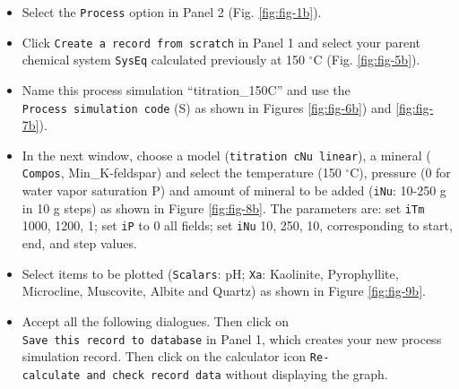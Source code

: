 \documentclass[
]{book}
\begin{document}
\begin{itemize}
\item
  Select the \texttt{Process} option in Panel 2 (Fig. \ref{fig:fig-1b}).
\item
  Click \texttt{Create\ a\ record\ from\ scratch} in Panel 1 and select your parent chemical system \texttt{SysEq} calculated previously at 150 \(^\circ\)C (Fig. \ref{fig:fig-5b}).
\item
  Name this process simulation ``titration\_150C'' and use the \texttt{Process\ simulation\ code} (S) as shown in Figures \ref{fig:fig-6b}) and \ref{fig:fig-7b}).
\item
  In the next window, choose a model (\texttt{titration\ cNu\ linear}), a mineral ( \texttt{Compos}, Min\_K-feldspar) and select the temperature (150 \(^\circ\)C), pressure (0 for water vapor saturation P) and amount of mineral to be added (\texttt{iNu}: 10-250 g in 10 g steps) as shown in Figure \ref{fig:fig-8b}. The parameters are: set \texttt{iTm} 1000, 1200, 1; set \texttt{iP} to 0 all fields; set \texttt{iNu} 10, 250, 10, corresponding to start, end, and step values.
\item
  Select items to be plotted (\texttt{Scalars}: pH; \texttt{Xa}: Kaolinite, Pyrophyllite, Microcline, Muscovite, Albite and Quartz) as shown in Figure \ref{fig:fig-9b}.
\item
  Accept all the following dialogues. Then click on \texttt{Save\ this\ record\ to\ database} in Panel 1, which creates your new process simulation record. Then click on the calculator icon \texttt{Re-calculate\ and\ check\ record\ data} without displaying the graph.
\end{itemize}
\end{document}
